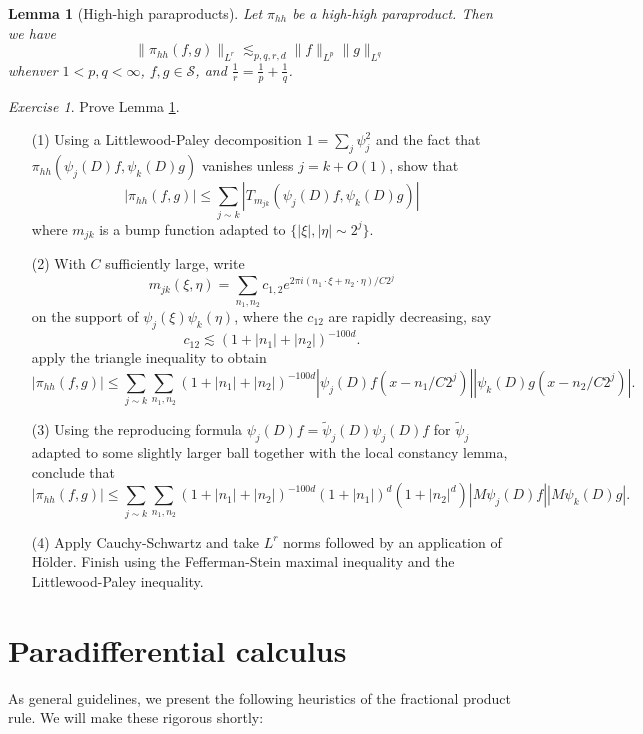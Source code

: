 \documentclass[11pt]{article}
\newtheorem{lem}[thm]{Lemma}
\theoremstyle{remark}
\newtheorem{exr}{Exercise}
\newcommand{\calS}{\mathcal{S}}
\newcommand{\1}{\textbf{1}}
\newcommand{\lle}{\lesssim}
\def\norm#1{\| #1  \|}
\begin{document}
\begin{lem}[High-high paraproducts]
Let $\pi_{hh}$ be a high-high paraproduct. Then we have
\[
\norm{\pi_{hh}(f,g)}_{L^r} \lle_{p,q,r,d} \norm{f}_{L^p} \norm{g}_{L^q}
\]
whenver $1 < p,q < \infty$, $f,g \in \calS$, and $\frac{1}{r} = \frac{1}{p} + \frac{1}{q}$.
\label{lem:hh}
\end{lem}
\begin{exr}
Prove Lemma \ref{lem:hh}.
\begin{enumerate}
\item[(1)] Using a Littlewood-Paley decomposition $1 = \sum_j \psi_j^2$ and the fact that $\pi_{hh}(\psi_j(D)f , \psi_k(D) g)$ vanishes unless $j = k + O(1)$, show that
\[
|\pi_{hh}(f,g)|  \leq \sum_{j \sim k} |T_{m_{jk}}(\psi_j(D)f, \psi_k(D) g)|
\]
where $m_{jk}$ is a bump function adapted to $\{|\xi|, |\eta| \sim 2^j\}$.
\item[(2)] With $C$ sufficiently large, write
\[
m_{jk}(\xi,\eta) = \sum_{n_1,n_2} c_{1,2} e^{2\pi i(n_1 \cdot \xi + n_2 \cdot \eta)/C2^j}
\]
on the support of $\psi_j(\xi) \psi_k(\eta)$, where the $c_{12}$ are rapidly decreasing, say
\[
c_{12} \lle (1 + |n_1| + |n_2|)^{-100d}.
\]
apply the triangle inequality to obtain
\[
|\pi_{hh}(f,g)|  \leq \sum_{j \sim k} \sum_{n_1,n_2} (1 + |n_1| + |n_2|)^{-100d}|\psi_j(D)f(x-n_1/C2^j)||\psi_k(D) g(x - n_2/C2^j)|.
\]
\item[(3)] Using the reproducing formula $\psi_j(D) f =\widetilde{\psi}_j(D) \psi_j(D) f$ for $\widetilde{\psi}_j$ adapted to some slightly larger ball together with the local constancy lemma, conclude that
\[
|\pi_{hh}(f,g)|  \leq \sum_{j \sim k} \sum_{n_1,n_2} (1 + |n_1| + |n_2|)^{-100d}(1+|n_1|)^d (1 + |n_2|^d )|M\psi_j(D)f||M\psi_k(D) g|.
\]
\item[(4)] Apply Cauchy-Schwartz and take $L^r$ norms followed by an application of H\"older. Finish using the Fefferman-Stein maximal inequality and the Littlewood-Paley inequality.
\end{enumerate}
\end{exr}
\section*{Paradifferential calculus}

As general guidelines, we present the following heuristics of the fractional product rule. We will make these rigorous shortly:
\end{document}
